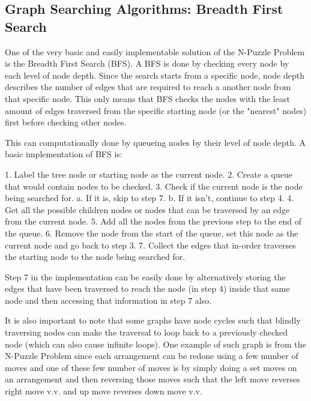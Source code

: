 \subsection{Graph Searching Algorithms: Breadth First Search}

\par One of the very basic and easily implementable solution of the N-Puzzle Problem is the Breadth First Search (BFS). A BFS is done by checking every node by each level of node depth. Since the search starts from a specific node, node depth describes the number of edges that are required to reach a another node from that specific node. This only means that BFS checks the nodes with the least amount of edges traversed from the specific starting node (or the "nearest" nodes) first before checking other nodes.

\par This can computationally done by queueing nodes by their level of node depth. A basic implementation of BFS is:

1. Label the tree node or starting node as the current node.
2. Create a queue that would contain nodes to be checked.
3. Check if the current node is the node being searched for.
  a. If it is, skip to step 7.
  b. If it isn't, continue to step 4.
4. Get all the possible children nodes or nodes that can be traversed by an edge from the current node.
5. Add all the nodes from the previous step to the end of the queue.
6. Remove the node from the start of the queue, set this node as the current node and go back to step 3.
7. Collect the edges that in-order traverses the starting node to the node being searched for.

\par Step 7 in the implementation can be easily done by alternatively storing the edges that have been traversed to reach the node (in step 4) inside that same node and then accessing that information in step 7 also.

\par It is also important to note that some graphs have node cycles such that blindly traversing nodes can make the traversal to loop back to a previously checked node (which can also cause infinite loops). One example of such graph is from the N-Puzzle Problem since each arrangement can be redone using a few number of moves and one of these few number of moves is by simply doing a set moves on an arrangement and then reversing those moves such that the left move reverses right move v.v. and up move reverses down move v.v.

